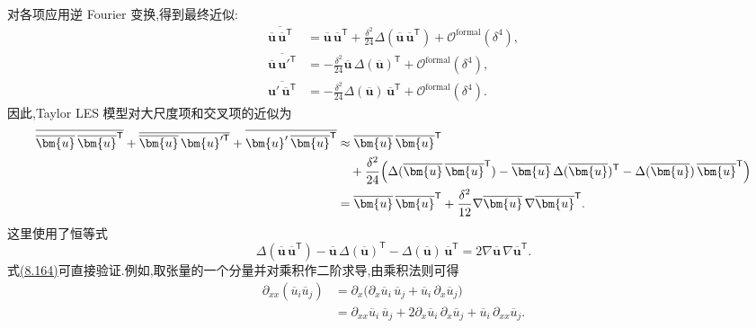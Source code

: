 \begin{note}
\label{note:les-taylor-model}
对各项应用逆 Fourier 变换,得到最终近似:
\[
\begin{aligned}
 \overline{\overline{\bm{u}}\,
  \overline{\bm{u}}^{\mathsf T}}
 &=\overline{\bm{u}}\,
   \overline{\bm{u}}^{\mathsf T}
  +\frac{\delta^2}{24}
   \Delta(\overline{\bm{u}}\,
   \overline{\bm{u}}^{\mathsf T})
  +\mathcal{O}^{\mathrm{formal}}(\delta^4),\\
 \overline{\overline{\bm{u}}\,\bm{u}'^{\mathsf T}}
 &=-\frac{\delta^2}{24}
   \overline{\bm{u}}\,
   \Delta(\overline{\bm{u}})^{\mathsf T}
   +\mathcal{O}^{\mathrm{formal}}(\delta^4),\\
 \overline{\bm{u}'\,\overline{\bm{u}}^{\mathsf T}}
 &=-\frac{\delta^2}{24}
   \Delta(\overline{\bm{u}})\,
   \overline{\bm{u}}^{\mathsf T}
   +\mathcal{O}^{\mathrm{formal}}(\delta^4).
\end{aligned}
\]
因此,Taylor LES 模型对大尺度项和交叉项的近似为
\begin{equation}\label{eq:taylor-les-large-cross-model}
\begin{aligned}
 \overline{\overline{\bm{u}}\,
  \overline{\bm{u}}^{\mathsf T}}
 +\overline{\overline{\bm{u}}\,\bm{u}'^{\mathsf T}}
 +\overline{\bm{u}'\,\overline{\bm{u}}^{\mathsf T}}
 &\approx \overline{\bm{u}}\,
          \overline{\bm{u}}^{\mathsf T}\\
 &\quad+\frac{\delta^2}{24}\Bigl(
    \Delta(\overline{\bm{u}}\,
    \overline{\bm{u}}^{\mathsf T})
   -\overline{\bm{u}}\,
    \Delta(\overline{\bm{u}})^{\mathsf T}
   -\Delta(\overline{\bm{u}})\,
    \overline{\bm{u}}^{\mathsf T}\Bigr)\\
 &=\overline{\bm{u}}\,
   \overline{\bm{u}}^{\mathsf T}
  +\frac{\delta^2}{12}
   \nabla\overline{\bm{u}}\,
   \nabla\overline{\bm{u}}^{\mathsf T}.
\end{aligned}
\end{equation}
这里使用了恒等式
\begin{equation}\label{eq:taylor-les-product-identity}
 \Delta(\overline{\bm{u}}\,
       \overline{\bm{u}}^{\mathsf T})
 -\overline{\bm{u}}\,
  \Delta(\overline{\bm{u}})^{\mathsf T}
 -\Delta(\overline{\bm{u}})\,
  \overline{\bm{u}}^{\mathsf T}
 =2\nabla\overline{\bm{u}}\,
    \nabla\overline{\bm{u}}^{\mathsf T}.
\end{equation}
式\hyperref[eq:taylor-les-product-identity]{(8.164)}可直接验证.例如,取张量的一个分量并对乘积作二阶求导,由乘积法则可得
\[
\begin{aligned}
 \partial_{xx}(\overline{u}_i\overline{u}_j)
 &=\partial_x\bigl(
   \partial_x\overline{u}_i\,\overline{u}_j
  +\overline{u}_i\,\partial_x\overline{u}_j\bigr)\\
 &=\partial_{xx}\overline{u}_i\,\overline{u}_j
  +2\partial_x\overline{u}_i\,\partial_x\overline{u}_j
  +\overline{u}_i\,\partial_{xx}\overline{u}_j.
\end{aligned}
\]
\end{note}
